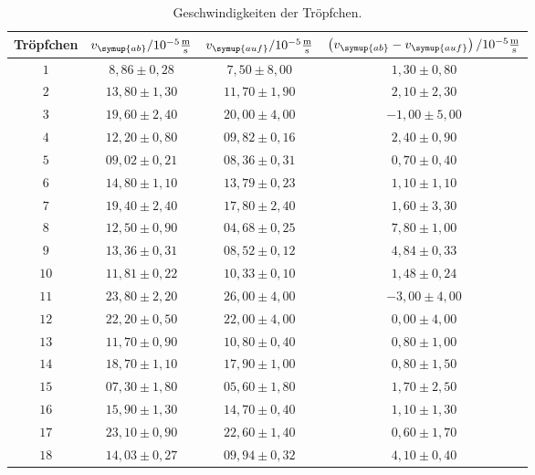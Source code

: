 \begin{table}
  \centering
  \caption{Geschwindigkeiten der Tröpfchen.}
  \label{tab:Geschwindigkeit}
  \begin{tabular}{c | c c c}
    \toprule
    Tröpfchen & $v_{\symup{ab}}/10^{-5}\frac{\si{\meter}}{\si{\second}}$ & $v_{\symup{auf}}/10^{-5}\frac{\si{\meter}}{\si{\second}}$ &
    $\left(v_{\symup{ab}} - v_{\symup{auf}}\right)/10^{-5}\frac{\si{\meter}}{\si{\second}}$ \\
    \midrule
    $  1 $ & $  8,86 \pm 0,28 $ & $  7,50 \pm 8,00 $ & $ 1,30 \pm 0,80 $ \\
    $  2 $ & $ 13,80 \pm 1,30 $ & $ 11,70 \pm 1,90 $ & $ 2,10 \pm 2,30 $ \\
    $  3 $ & $ 19,60 \pm 2,40 $ & $ 20,00 \pm 4,00 $ & $-1,00 \pm 5,00 $ \\
    $  4 $ & $ 12,20 \pm 0,80 $ & $ 09,82 \pm 0,16 $ & $ 2,40 \pm 0,90 $ \\
    $  5 $ & $ 09,02 \pm 0,21 $ & $ 08,36 \pm 0,31 $ & $ 0,70 \pm 0,40 $ \\
    $  6 $ & $ 14,80 \pm 1,10 $ & $ 13,79 \pm 0,23 $ & $ 1,10 \pm 1,10 $  \\
    $  7 $ & $ 19,40 \pm 2,40 $ & $ 17,80 \pm 2,40 $ & $ 1,60 \pm 3,30 $  \\
    $  8 $ & $ 12,50 \pm 0,90 $ & $ 04,68 \pm 0,25 $ & $ 7,80 \pm 1,00 $  \\
    $  9 $ & $ 13,36 \pm 0,31 $ & $ 08,52 \pm 0,12 $ & $ 4,84 \pm 0,33 $  \\
    $ 10 $ & $ 11,81 \pm 0,22 $ & $ 10,33 \pm 0,10 $ & $ 1,48 \pm 0,24 $  \\
    $ 11 $ & $ 23,80 \pm 2,20 $ & $ 26,00 \pm 4,00 $ & $-3,00 \pm 4,00 $ \\
    $ 12 $ & $ 22,20 \pm 0,50 $ & $ 22,00 \pm 4,00 $ & $ 0,00 \pm 4,00 $ \\
    $ 13 $ & $ 11,70 \pm 0,90 $ & $ 10,80 \pm 0,40 $ & $ 0,80 \pm 1,00 $ \\
    $ 14 $ & $ 18,70 \pm 1,10 $ & $ 17,90 \pm 1,00 $ & $ 0,80 \pm 1,50 $ \\
    $ 15 $ & $ 07,30 \pm 1,80 $ & $ 05,60 \pm 1,80 $ & $ 1,70 \pm 2,50 $ \\
    $ 16 $ & $ 15,90 \pm 1,30 $ & $ 14,70 \pm 0,40 $ & $ 1,10 \pm 1,30 $ \\
    $ 17 $ & $ 23,10 \pm 0,90 $ & $ 22,60 \pm 1,40 $ & $ 0,60 \pm 1,70 $ \\
    $ 18 $ & $ 14,03 \pm 0,27 $ & $ 09,94 \pm 0,32 $ & $ 4,10 \pm 0,40 $ \\

\end{tabular}
\end{table}
